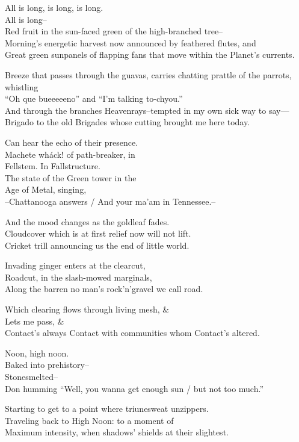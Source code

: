 All is long, is long, is long. \\
All is long-- \\

Red fruit in the sun-faced green of the high-branched tree-- \\
Morning's energetic harvest now announced by feathered flutes, and \\
Great green sunpanels of flapping fans that move within the Planet's currents.

Breeze that passes through the guavas, carries chatting prattle of the parrots, whistling \\
“Oh que bueeeeeno” and “I'm talking to-chyou.” \\
And through the branches Heavenrays--tempted in my own sick way to say— \\
Brigado to the old Brigades whose cutting brought me here today. 

Can hear the echo of their presence. \\
Machete wháck! of path-breaker, in \\
Fellstem. In Fallstructure. \\
The state of the Green tower in the \\
Age of Metal, singing, \\
--Chattanooga answers / And your ma'am in Tennessee.-- 

And the mood changes as the goldleaf fades. \\
Cloudcover which is at first relief now will not lift. \\
Cricket trill announcing us the end of little world.

Invading ginger enters at the clearcut, \\
Roadcut, in the slash-mowed marginals, \\
Along the barren no man's rock'n'gravel we call road. 

Which clearing flows through living mesh, \& \\
Lets me pass, \& \\
Contact's always Contact with communities whom Contact's altered.

\secdiv

Noon, high noon. \\
Baked into prehistory-- \\
Stonesmelted--\\ 
Don humming “Well, you wanna get enough sun / but not too much.” 

Starting to get to a point where triunesweat unzippers. \\
Traveling back to High Noon: to a moment of \\
Maximum intensity, when shadows' shields at their slightest. 

